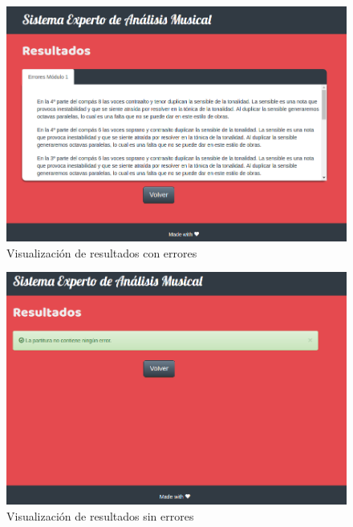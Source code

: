 \begin{figure}[H]
	\centering
	\includegraphics[scale=0.35]{imagenes/interfaz5.png}
	\caption{Visualización de resultados con errores}
	\label{fig5.3.3}
\end{figure}

\begin{figure}[H]
	\centering
	\includegraphics[scale=0.35]{imagenes/interfaz6.png}
	\caption{Visualización de resultados sin errores}
	\label{fig5.3.4}
\end{figure}